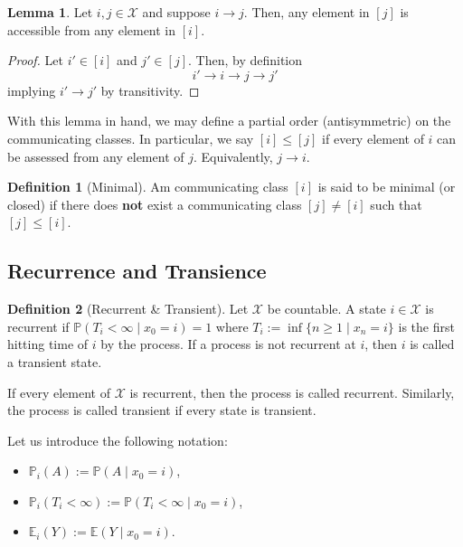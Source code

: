 \documentclass[]{article}
\theoremstyle{definition}
\theoremstyle{definition}
\newtheorem{definition}{Definition}[section]
\newtheorem{lemma}{Lemma}[section]
\begin{document}
\begin{lemma}
  Let \(i, j \in \mathcal{X}\) and suppose \(i \longrightarrow j\). Then, 
  any element in \([j]\) is accessible from any element in \([i]\).
\end{lemma}
\begin{proof}
  Let \(i' \in [i]\) and \(j' \in [j]\). Then, by definition
  \[i' \longrightarrow i \longrightarrow j \longrightarrow j'\]
  implying \(i' \longrightarrow j'\) by transitivity.
\end{proof}

With this lemma in hand, we may define a partial order (antisymmetric) on the 
communicating classes. In particular, we say \([i] \le [j]\) if every element of 
\(i\) can be assessed from any element of \(j\). Equivalently, \(j \longrightarrow i\). 

\begin{definition}[Minimal]
  Am communicating class \([i]\) is said to be minimal (or closed) if there does \textbf{not} exist 
  a communicating class \([j] \neq [i]\) such that \([j] \le [i]\).
\end{definition}

\subsection{Recurrence and Transience}

\begin{definition}[Recurrent \& Transient]
  Let \(\mathcal{X}\) be countable. A state \(i \in \mathcal{X}\) is recurrent 
  if \(\mathbb{P}(T_i < \infty \mid x_0 = i) = 1\) where \(T_i := \inf\{n \ge 1 \mid x_n = i\}\)
  is the first hitting time of \(i\) by the process. If a process is not recurrent 
  at \(i\), then \(i\) is called a transient state.
  
  If every element of \(\mathcal{X}\) is recurrent, then the process is called 
  recurrent. Similarly, the process is called transient if every state is transient.
\end{definition}

Let us introduce the following notation:
\begin{itemize}
  \item \(\mathbb{P}_i(A) := \mathbb{P}(A \mid x_0 = i)\),
  \item \(\mathbb{P}_i(T_i < \infty) := \mathbb{P}(T_i < \infty \mid x_0 = i)\),
  \item \(\mathbb{E}_i(Y) := \mathbb{E}(Y \mid x_0 = i)\).
\end{itemize}
\end{document}
